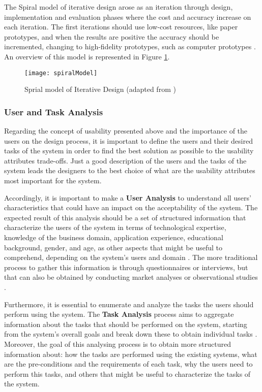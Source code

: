 The Spiral model of iterative design arose as an iteration through design, implementation and evaluation phases where the cost and accuracy increase on each iteration. The first iterations should use low-cost resources, like paper prototypes, and when the results are positive the accuracy should be incremented, changing to high-fidelity prototypes, such as computer prototypes \cite{interactionDesign_beyondHumanComputerInteraction}. An overview of this model is represented in  Figure \ref{fig:spiralModel}.

\begin{figure}[htbp]
	\centering
	\texttt{[image: spiralModel]}
	\caption{Sprial model of Iterative Design (adapted from \cite{interactionDesign_beyondHumanComputerInteraction})}
	\label{fig:spiralModel}
\end{figure}

\subsubsection{User and Task Analysis}
\label{subsubsec:user_and_task_analysis}
Regarding the concept of usability presented above and the importance of the users on the design process, it is important to define the users and their desired tasks of the system in order to find the best solution as possible to the usability attributes trade-offs. Just a good description of the users and the tasks of the system leads the designers to the best choice of what are the usability attributes most important for the system.

Accordingly, it is important to make a \textbf{User Analysis} to understand all users’ characteristics that could have an impact on the acceptability of the system. The expected result of this analysis should be a set of structured information that characterize the users of the system in terms of technological expertise, knowledge of the business domain, application experience, educational background, gender, and age, as other aspects that might be useful to comprehend, depending on the system’s users and domain \cite{userAnalysisInHCI_theHistoricalLessonFromIndividualDifferencesResearch}. The more traditional process to gather this information is through questionnaires or interviews, but that can also be obtained by conducting market analyses or observational studies \cite{usabilityEngineering}.

Furthermore, it is essential to enumerate and analyze the tasks the users should perform using the system. The \textbf{Task Analysis} process aims to aggregate information about the tasks that should be performed on the system, starting from the system's overall goals and break down these to obtain individual tasks \cite{usabilityEngineering}. Moreover, the goal of this analysing process is to obtain more structured information about: how the tasks are performed using the existing systems, what are the pre-conditions and the requirements of each task, why the users need to perform this tasks, and others that might be useful to characterize the tasks of the system. 

